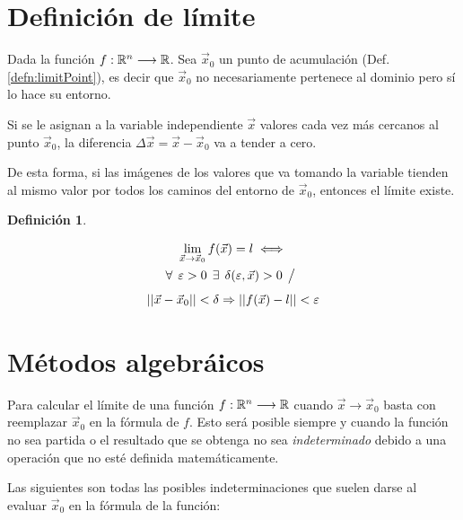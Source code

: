 \documentclass[a5paper,12pt,twoside]{book}
\newtheorem{defn}{{Definición}}[chapter]
\begin{document}
\section{Definición de límite}

Dada la función $f:\mathbb{R}^n \longrightarrow \mathbb{R}$. Sea $\Vec{x}_0$ un punto de acumulación (Def. \ref{defn:limitPoint}), es decir que $\Vec{x}_0$ no necesariamente pertenece al dominio pero sí lo hace su entorno.

Si se le asignan a la variable independiente $\Vec{x}$ valores cada vez más cercanos al punto $\Vec{x}_0$, la diferencia $\Delta \Vec{x} = \Vec{x}-\Vec{x}_0$ va a tender a cero.

De esta forma, si las imágenes de los valores que va tomando la variable tienden al mismo valor por todos los caminos del entorno de $\Vec{x}_0$, entonces el límite existe.

\begin{mdframed}[style=MyFrame1]
    \begin{defn}
    \end{defn}
    \begin{gather*}
        \lim_{\Vec{x} \to \Vec{x}_0} f(\Vec{x})=l \iff
        \\
        \forall \hspace{1ex} \varepsilon >0 \hspace{1ex} \exists \hspace{1ex} \delta(\varepsilon,\Vec{x})>0 \hspace{1ex} \big/ \hspace{1ex}
        \\[1ex]
        {\left|\left| { \Vec{x}-\Vec{x}_0 } \right|\right|} < \delta \Rightarrow {\left|\left| { f(\Vec{x})-l } \right|\right|} < \varepsilon
    \end{gather*}
\end{mdframed}


\section{Métodos algebráicos}

Para calcular el límite de una función $f:\mathbb{R}^n \longrightarrow \mathbb{R}$ cuando $\Vec{x} \to \Vec{x}_0$ basta con reemplazar $\Vec{x}_0$ en la fórmula de $f$. Esto será posible siempre y cuando la función no sea partida o el resultado que se obtenga no sea \emph{indeterminado} debido a una operación que no esté definida matemáticamente.

Las siguientes son todas las posibles indeterminaciones que suelen darse al evaluar $\Vec{x}_0$ en la fórmula de la función:
\end{document}
